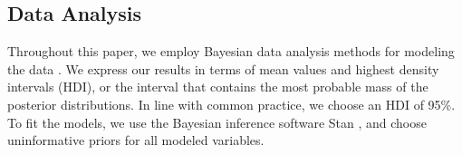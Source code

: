 \subsection{Data Analysis}
Throughout this paper, we employ Bayesian data analysis methods for modeling the data \cite{kruschke_doing_2010}. We express our results in terms of mean values and highest density intervals (HDI), or the interval that contains the most probable mass of the posterior distributions. In line with common practice, we choose an HDI of 95\%. To fit the models, we use the Bayesian inference software Stan \cite{stan-software:2013}, and choose uninformative priors for all modeled variables.




